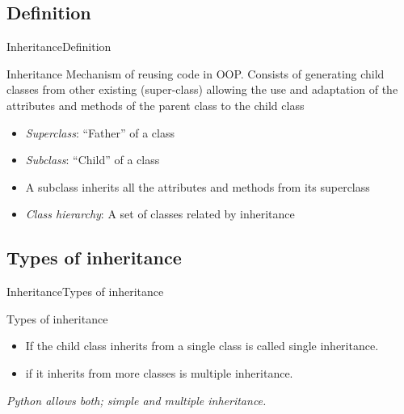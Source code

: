\documentclass[10pt,compress]{beamer} %
\begin{document}
\subsection{Definition}

\begin{frame}{Inheritance}{Definition}
\vspace{-0.2cm}
	\begin{block}{Inheritance}
	Mechanism of \alert{reusing} code in OOP. Consists of generating child classes from other existing (\alert{super-class}) allowing the use and adaptation of the attributes and methods of the parent class to the child class
  	\end{block}	
\vspace{-0.2cm}
\begin{block}{}
\begin{itemize}
		\item {\textit{Superclass}: ``Father'' of a class}
		\item {\textit{Subclass}: ``Child'' of a class}
		\item {A subclass inherits all the attributes and methods from its superclass}
		\item {\textit{Class hierarchy}: A set of classes related by inheritance}
\end{itemize}
	\end{block}
\end{frame}

\subsection{Types of inheritance}

\begin{frame}{Inheritance}{Types of inheritance}
	\begin{block}{Types of inheritance}
	\begin{itemize}
		\item If the child class inherits from a single class is called \alert{single inheritance}.
		\item if it inherits from more classes is \alert{multiple inheritance}.
	\end{itemize}
	\end{block}
	\medskip
	   \textit{Python allows both; simple and multiple inheritance.}
\end{frame}
\end{document}
